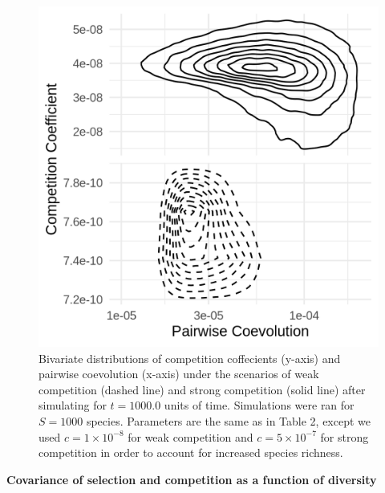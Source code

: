 \documentclass[]{article}
\begin{document}
\begin{figure}

{\centering \includegraphics{on_pl} 

}

\caption{\label{net}Bivariate distributions of competition coffecients (y-axis) and pairwise coevolution (x-axis) under the scenarios of weak competition (dashed line) and strong competition (solid line) after simulating for $t=1000.0$ units of time. Simulations were ran for $S=1000$ species. Parameters are the same as in Table 2, except we used $c=1\times 10^{-8}$ for weak competition and $c=5\times 10^{-7}$ for strong competition in order to account for increased species richness.}\label{fig:unnamed-chunk-8}
\end{figure}

\textbf{Covariance of selection and competition as a function of
diversity}
\end{document}
